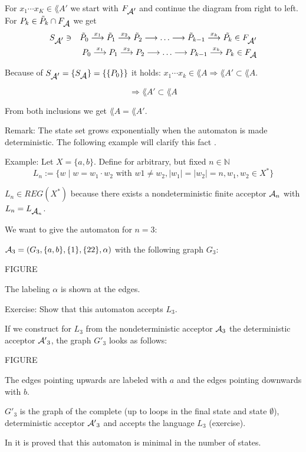 For $x_1 \cdots x_K \in \lang{A'}$ we start with $F_{\mbox{$\mathcal{A'}$}}$ and continue
the diagram from right to left. For $P_k \in \tilde{P}_k \cap F_{\mbox{$\mathcal{A}$}}$ we get
\begin{eqnarray*}
 & S_{\mbox{$\mathcal{A'}$}} \ni & \tilde{P}_0 \stackrel{x_1}{\longrightarrow} \tilde{P}_1 \stackrel{x_2}{\longrightarrow} \tilde{P}_2 \stackrel{}{\longrightarrow} \ldots
 \stackrel{}{\longrightarrow} \tilde{P}_{k-1} \stackrel{x_k}{\longrightarrow} \tilde{P_k} \in F_{\mbox{$\mathcal{A'}$}} \\
 & & P_0 \stackrel{x_1}{\longrightarrow} P_1 \stackrel{x_2}{\longrightarrow} P_2 \stackrel{}{\longrightarrow} \ldots \stackrel{}{\longrightarrow}
 P_{k-1} \stackrel{x_k}{\longrightarrow} P_k \in F_{\mbox{$\mathcal{A}$}} 
\end{eqnarray*}

Because of $S_{\mbox{$\mathcal{A'}$}} = \{ S_{\mbox{$\mathcal{A}$}} \} = \{\{ P_0 \}\}$ it holds: $x_1
\cdots x_k \in \lang{A} \Rightarrow \lang{A'} \subset \lang{A}$.

\[ \Rightarrow \lang{A'} \subset \lang{A}\]

From both inclusions we get $\lang{A} = \lang{A'}$.

Remark: The state set grows exponentially when the automaton is made
deterministic. The following example will clarify this fact \cite{Co}.

Example: Let $X = \{ a, b \}$. Define for arbitrary, but fixed $n \in
\mathbb{N}$ \[ L_n := \{ w \mid w = w_1 \cdot w_2 \mbox{ with } w1 \neq w_2, |w_1| = |w_2|
= n, w_1, w_2 \in X^* \} \]

$L_n \in REG(X^*)$ because there exists a nondeterministic finite acceptor
$\mbox{$\mathcal{A}$}_{n}$ with $L_n = L_{\mbox{$\mathcal{A}$}_{n}}$.

We want to give the automaton for $n = 3$:

$\mbox{$\mathcal{A}$}_3 = (G_3, \{a,b\}, \{1\}, \{22\}, \alpha)$ with the following graph
$G_3$:

FIGURE

The labeling $\alpha$ is shown at the edges.

Exercise: Show that this automaton accepts $L_3$.

If we construct for $L_3$ from the nondeterministic acceptor $\mbox{$\mathcal{A}$}_3$
the deterministic acceptor $\mbox{$\mathcal{A'}$}_3$, the graph $G'_3$ looks as follows:

FIGURE

The edges pointing upwards are labeled with $a$ and the edges pointing downwards
with $b$.

$G'_3$ is the graph of the complete (up to loops in the final state and state
$\emptyset$), deterministic acceptor $\mbox{$\mathcal{A'}$}_3$ and accepts the language $L_3$
(exercise).

In \cite{Co} it is proved that this automaton is minimal in the number of
states.

